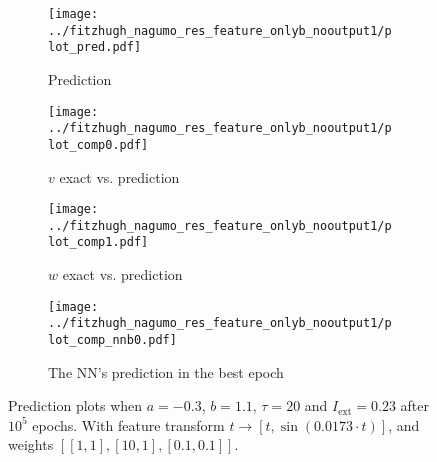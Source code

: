 \documentclass[a4paper]{article}
\begin{document}
\begin{figure}[H]
	\centering 
	\begin{subfigure}[b]{0.47\textwidth}
		\centering
		\texttt{[image: ../fitzhugh\_nagumo\_res\_feature\_onlyb\_nooutput1/plot\_pred.pdf]}
		\caption{Prediction}
		\label{fig:justb09a}
	\end{subfigure}
	\begin{subfigure}[b]{0.47\textwidth}
		\centering
		\texttt{[image: ../fitzhugh\_nagumo\_res\_feature\_onlyb\_nooutput1/plot\_comp0.pdf]}
		\caption{$v$ exact vs. prediction}
		\label{fig:justb09b}
	\end{subfigure}
	\begin{subfigure}[b]{0.47\textwidth}
		\centering
		\texttt{[image: ../fitzhugh\_nagumo\_res\_feature\_onlyb\_nooutput1/plot\_comp1.pdf]}
		\caption{$w$ exact vs. prediction}
		\label{fig:justb09c}
	\end{subfigure}
	\begin{subfigure}[b]{0.47\textwidth}
		\centering
		\texttt{[image: ../fitzhugh\_nagumo\_res\_feature\_onlyb\_nooutput1/plot\_comp\_nnb0.pdf]}
		\caption{The NN's prediction in the best epoch}
		\label{fig:justb09d}
	\end{subfigure}
	\caption{Prediction plots when $a=-0.3$, $b=1.1$, $\tau=20$ and $ I_{\text{ext}}=0.23$ after $10^5$ epochs. With feature transform $t \rightarrow \left[ t, \sin(0.0173\cdot t) \right] $, and weights $\left[ \left[ 1, 1\right], \left[ 10, 1\right], \left[ 0.1, 0.1 \right]\right]$.}
	\label{plot:justb09}
\end{figure} 	
\end{document}
